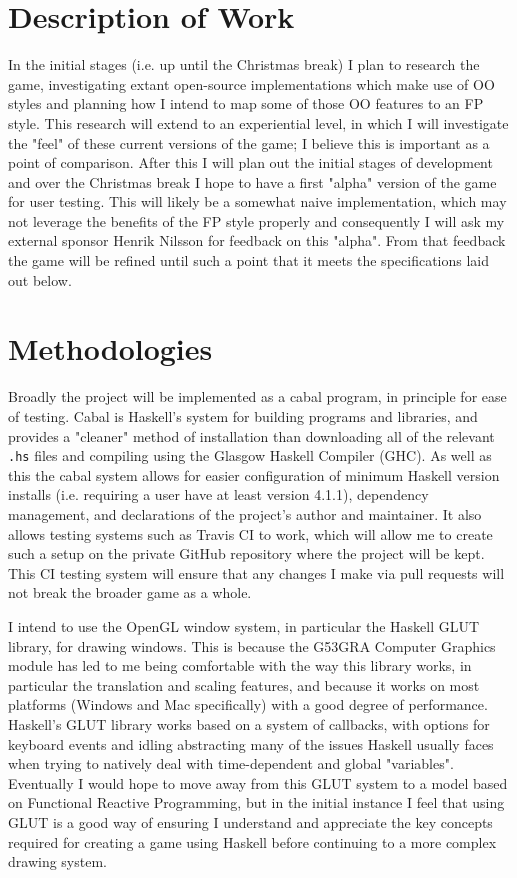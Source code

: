 \documentclass[12pt, a4paper]{report}
\begin{document}
\section{Description of Work}
In the initial stages (i.e. up until the Christmas break) I plan to research the game, investigating extant open-source implementations which make use of OO styles and planning how I intend to map some of those OO features to an FP style.
This research will extend to an experiential level, in which I will investigate the "feel" of these current versions of the game; I believe this is important as a point of comparison.
After this I will plan out the initial stages of development and over the Christmas break I hope to have a first "alpha" version of the game for user testing.
This will likely be a somewhat naive implementation, which may not leverage the benefits of the FP style properly and consequently I will ask my external sponsor Henrik Nilsson for feedback on this "alpha".
From that feedback the game will be refined until such a point that it meets the specifications laid out below.


\section{Methodologies}
Broadly the project will be implemented as a cabal program, in principle for ease of testing.
Cabal is Haskell's system for building programs and libraries\cite{cabal}, and provides a "cleaner" method of installation than downloading all of the relevant \verb|.hs| files and compiling using the Glasgow Haskell Compiler (GHC).
As well as this the cabal system allows for easier configuration of minimum Haskell version installs (i.e. requiring a user have at least version 4.1.1), dependency management, and declarations of the project's author and maintainer.
It also allows testing systems such as Travis CI to work\cite{travisci}, which will allow me to create such a setup on the private GitHub repository where the project will be kept.
This CI testing system will ensure that any changes I make via pull requests will not break the broader game as a whole.

\par

I intend to use the OpenGL window system, in particular the Haskell GLUT library, for drawing windows.
This is because the G53GRA Computer Graphics module has led to me being comfortable with the way this library works, in particular the translation and scaling features, and because it works on most platforms (Windows and Mac specifically) with a good degree of performance.
Haskell's GLUT library works based on a system of callbacks\cite{glutpage}, with options for keyboard events and idling abstracting many of the issues Haskell usually faces when trying to natively deal with time-dependent and global "variables".
Eventually I would hope to move away from this GLUT system to a model based on Functional Reactive Programming, but in the initial instance I feel that using GLUT is a good way of ensuring I understand and appreciate the key concepts required for creating a game using Haskell before continuing to a more complex drawing system.
\end{document}
